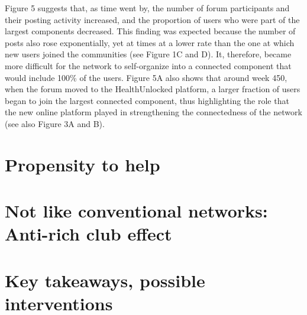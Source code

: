 Figure 5 suggests that, as time went by, the number of forum participants and their posting activity increased, and the proportion of users who were part of the largest components decreased. This finding was expected because the number of posts also rose exponentially, yet at times at a lower rate than the one at which new users joined the communities (see Figure 1C and D). It, therefore, became more difficult for the network to self-organize into a connected component that would include 100\% of the users. Figure 5A also shows that around week 450, when the forum moved to the HealthUnlocked platform, a larger fraction of users began to join the largest connected component, thus highlighting the role that the new online platform played in strengthening the connectedness of the network (see also Figure 3A and B).
\section{Propensity to help} 


\section{Not like conventional networks: Anti-rich club effect}


\section{Key takeaways, possible interventions}

